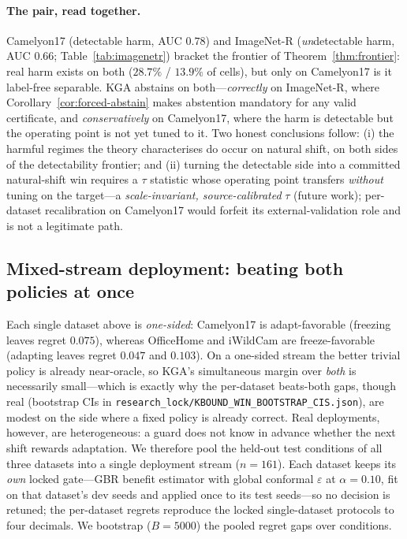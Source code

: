 \documentclass[conference]{IEEEtran}
\theoremstyle{plain}
\theoremstyle{definition}
\begin{document}
\paragraph{The pair, read together.} Camelyon17 (detectable harm, AUC $0.78$) and ImageNet-R
(\emph{un}detectable harm, AUC $0.66$; Table~\ref{tab:imagenetr}) bracket the frontier of
Theorem~\ref{thm:frontier}: real harm exists on both ($28.7\%$ / $13.9\%$ of cells), but only on
Camelyon17 is it label-free separable. \textsc{KGA} abstains on both---\emph{correctly} on
ImageNet-R, where Corollary~\ref{cor:forced-abstain} makes abstention mandatory for any valid
certificate, and \emph{conservatively} on Camelyon17, where the harm is detectable but the
operating point is not yet tuned to it. Two honest conclusions follow: (i) the harmful regimes the
theory characterises do occur on natural shift, on both sides of the detectability frontier; and
(ii) turning the detectable side into a committed natural-shift win requires a $\tau$ statistic
whose operating point transfers \emph{without} tuning on the target---a \emph{scale-invariant,
source-calibrated} $\tau$ (future work); per-dataset recalibration on Camelyon17 would forfeit its
external-validation role and is not a legitimate path.

\subsection{Mixed-stream deployment: beating both policies at once}\label{sec:mixedstream}
Each single dataset above is \emph{one-sided}: Camelyon17 is adapt-favorable
(freezing leaves regret $0.075$), whereas OfficeHome and iWildCam are
freeze-favorable (adapting leaves regret $0.047$ and $0.103$). On a one-sided
stream the better trivial policy is already near-oracle, so \textsc{KGA}'s
simultaneous margin over \emph{both} is necessarily small---which is exactly why
the per-dataset beats-both gaps, though real (bootstrap CIs in
\texttt{research\_lock/KBOUND\_WIN\_BOOTSTRAP\_CIS.json}), are modest on the side
where a fixed policy is already correct. Real deployments, however, are
heterogeneous: a guard does not know in advance whether the next shift rewards
adaptation. We therefore pool the held-out test conditions of all three datasets
into a single deployment stream ($n{=}161$). Each dataset keeps its \emph{own}
locked gate---GBR benefit estimator with global conformal $\varepsilon$ at
$\alpha{=}0.10$, fit on that dataset's dev seeds and applied once to its test
seeds---so no decision is retuned; the per-dataset regrets reproduce the locked
single-dataset protocols to four decimals. We bootstrap ($B{=}5000$) the pooled
regret gaps over conditions.
\end{document}
